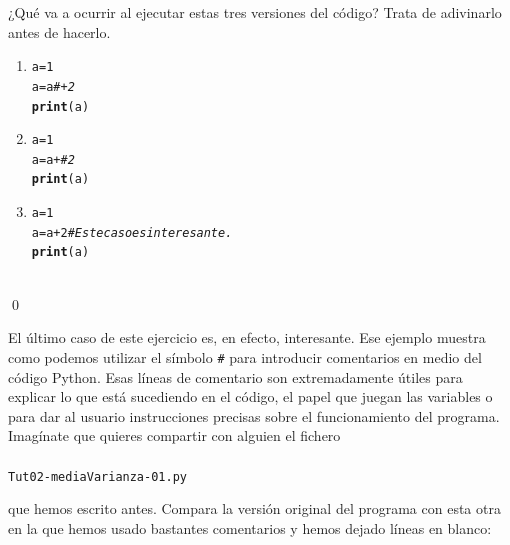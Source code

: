 \documentclass[10pt,a4paper]{article}\usepackage[]{graphicx}\usepackage[]{color}
\makeatletter
\newcommand{\hlcom}[1]{\textcolor[rgb]{0.678,0.584,0.686}{\textit{#1}}}%
\newcommand{\hlkwd}[1]{\textcolor[rgb]{0.737,0.353,0.396}{\textbf{#1}}}%
\newenvironment{kframe}{%
 \def\at@end@of@kframe{}%
 \ifinner\ifhmode%
  \def\at@end@of@kframe{\end{minipage}}%
  \begin{minipage}{\columnwidth}%
 \fi\fi%
 \def\FrameCommand##1{\hskip\@totalleftmargin \hskip-\fboxsep
 \colorbox{shadecolor}{##1}\hskip-\fboxsep
     \hskip-\linewidth \hskip-\@totalleftmargin \hskip\columnwidth}%
 \MakeFramed {\advance\hsize-\width
   \@totalleftmargin\z@ \linewidth\hsize
   \@setminipage}}%
 {\par\unskip\endMakeFramed%
 \at@end@of@kframe}
\newenvironment{knitrout}{}{} %
\makeatother
\begin{document}
\begin{ejercicio}
\label{tut02:ejercicio18}
\quad
¿Qué va a ocurrir al ejecutar estas tres versiones del código? Trata de adivinarlo antes de hacerlo.
\begin{enumerate}
\item
\begin{knitrout}
\color{fgcolor}\begin{kframe}
\begin{alltt}
a = 1
a = a \hlcom{# + 2}
\hlkwd{print}(a)
\end{alltt}
\end{kframe}
\end{knitrout}
\item
\begin{knitrout}
\color{fgcolor}\begin{kframe}
\begin{alltt}
a = 1
a = a  + \hlcom{# 2}
\hlkwd{print}(a)
\end{alltt}
\end{kframe}
\end{knitrout}
\item
\begin{knitrout}
\color{fgcolor}\begin{kframe}
\begin{alltt}
a = 1
a = a  + 2 \hlcom{# Este caso es interesante.}
\hlkwd{print}(a)
\end{alltt}
\end{kframe}
\end{knitrout}
\end{enumerate}
\quad\\
\qed
\end{ejercicio}
El último caso de este ejercicio es, en efecto, interesante. Ese ejemplo muestra como podemos utilizar el símbolo \verb&#& para introducir comentarios en medio del código Python. Esas líneas de comentario son extremadamente útiles para explicar lo que está sucediendo en el código, el papel que juegan las variables o para dar al usuario instrucciones precisas sobre el funcionamiento del programa. Imagínate que quieres compartir con alguien el fichero
\paragraph{}\label{fichero:Tut02-mediaVarianza-01}\quad
\begin{knitrout}
\color{fgcolor}\begin{kframe}
\begin{alltt}
Tut02-mediaVarianza-01.py
\end{alltt}
\end{kframe}
\end{knitrout}
que hemos escrito antes. Compara la versión original del programa con esta otra en la que hemos usado bastantes comentarios y hemos dejado líneas en blanco:
\end{document}
